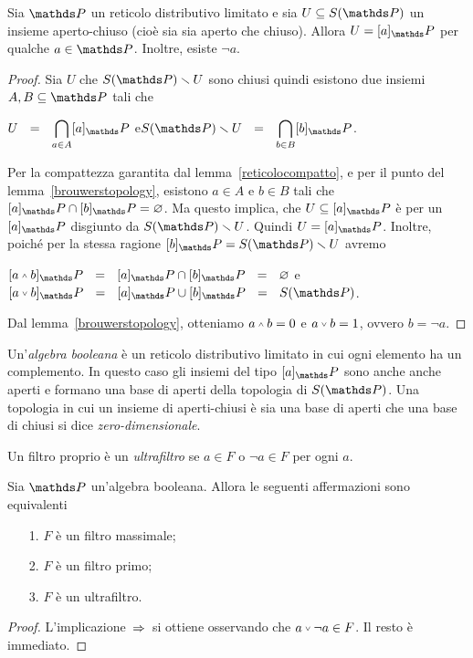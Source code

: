 \begin{lemma}\label{Stone_aperti_chiusi}
Sia $\PP$ un reticolo distributivo limitato e sia $U\subseteq S(\PP)$ un insieme aperto-chiuso (cio\`e sia sia aperto che chiuso). Allora $U=[a]_\PP$ per qualche $a\in\PP$. Inoltre, esiste $\neg a$.
\end{lemma}
\begin{proof}
Sia $U$ che $S(\PP)\sm U$ sono chiusi quindi esistono due insiemi $A, B\subseteq\PP$ tali che 

\hfil $\displaystyle U\ \ =\ \ \bigcap_{a\in A}[a]_\PP$  \hfil e\hfil $\displaystyle S(\PP)\sm U\ \ =\ \ \bigcap_{b\in B}[b]_\PP$.

Per la compattezza garantita dal lemma~\ref{reticolocompatto}, e per il punto  del lemma~\ref{brouwerstopology}, esistono $a\in A$ e $b\in B$ tali che $[a]_\PP\cap[b]_\PP=\0$. Ma questo implica, che $U\subseteq [a]_\PP$ \`e per un $[a]_\PP$ disgiunto da $S(\PP)\sm U$. Quindi $U= [a]_\PP$. Inoltre, poich\'e per la stessa ragione $[b]_\PP=S(\PP)\sm U$ avremo 

\hfil $[a\swedge  b]_\PP\ \ =\ \ [a]_\PP\cap[b]_\PP\ \ =\ \ \0$ \hfil e\hfil $[a\svee b]_\PP\ \ =\ \ [a]_\PP\cup[b]_\PP\ \ =\ \ S(\PP)$. 

Dal lemma~\ref{brouwerstopology}, otteniamo $a\swedge  b=0$ e $a\svee b=1$, ovvero $b=\neg a$.
\end{proof}


Un'\emph{algebra booleana\/} \`e un reticolo distributivo limitato in cui ogni elemento ha un complemento. In questo caso gli insiemi del tipo $[a]_\PP$ sono anche anche aperti e formano una base di aperti della topologia di $S(\PP)$. Una topologia in cui un insieme di aperti-chiusi \`e sia una base di aperti che una base di chiusi si dice \emph{zero-dimensionale}.

Un filtro proprio \`e un \emph{ultrafiltro\/} se $a\in F$ o $\neg a\in F$ per ogni $a$.

\begin{proposition}
Sia $\PP$ un'algebra booleana. Allora le seguenti affermazioni sono equivalenti
\begin{itemize}
\item[1.] $F$ \`e un filtro massimale;
\item[2.] $F$ \`e un filtro primo;
\item[3.] $F$ \`e un ultrafiltro.
\end{itemize}
\end{proposition}
\begin{proof}
L'implicazione \,$\Rightarrow$\, si ottiene osservando che $a\svee\neg a\in F$. Il resto \`e immediato.
\end{proof}

